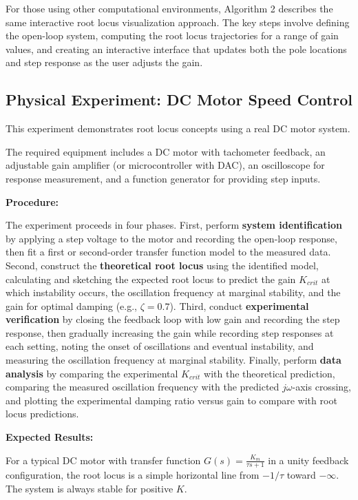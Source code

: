 For those using other computational environments, Algorithm 2 describes the same interactive root locus visualization approach. The key steps involve defining the open-loop system, computing the root locus trajectories for a range of gain values, and creating an interactive interface that updates both the pole locations and step response as the user adjusts the gain.

\subsection{Physical Experiment: DC Motor Speed Control}

This experiment demonstrates root locus concepts using a real DC motor system.

The required equipment includes a DC motor with tachometer feedback, an adjustable gain amplifier (or microcontroller with DAC), an oscilloscope for response measurement, and a function generator for providing step inputs.

\textbf{Procedure:}

The experiment proceeds in four phases. First, perform \textbf{system identification} by applying a step voltage to the motor and recording the open-loop response, then fit a first or second-order transfer function model to the measured data. Second, construct the \textbf{theoretical root locus} using the identified model, calculating and sketching the expected root locus to predict the gain $K_{crit}$ at which instability occurs, the oscillation frequency at marginal stability, and the gain for optimal damping (e.g., $\zeta = 0.7$). Third, conduct \textbf{experimental verification} by closing the feedback loop with low gain and recording the step response, then gradually increasing the gain while recording step responses at each setting, noting the onset of oscillations and eventual instability, and measuring the oscillation frequency at marginal stability. Finally, perform \textbf{data analysis} by comparing the experimental $K_{crit}$ with the theoretical prediction, comparing the measured oscillation frequency with the predicted $j\omega$-axis crossing, and plotting the experimental damping ratio versus gain to compare with root locus predictions.

\textbf{Expected Results:}

For a typical DC motor with transfer function $G(s) = \frac{K_m}{\tau s + 1}$ in a unity feedback configuration, the root locus is a simple horizontal line from $-1/\tau$ toward $-\infty$. The system is always stable for positive $K$.

